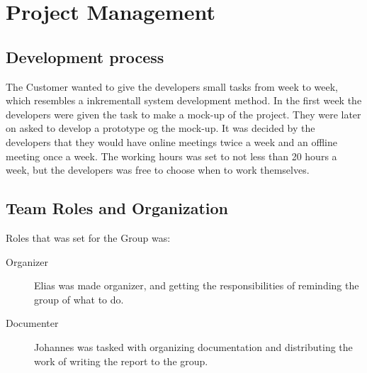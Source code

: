 \chapter{Project Management}
\section{Development process}
The Customer wanted to give the developers small tasks from week to week, which resembles a inkrementall system development method.
In the first week the developers were given the task to make a mock-up of the project. They were later on asked to develop a prototype og the mock-up.
It was decided by the developers that they would have online meetings twice a week and an offline meeting once a week. 
The working hours was set to not less than 20 hours a week, but the developers was free to choose when to work themselves.
\section{Team Roles and Organization}
Roles that was set for the Group was:
\begin{description}

\item[Organizer] Elias was made organizer, and getting the responsibilities of reminding the group of what to do.
\item[Documenter] Johannes was tasked with organizing documentation and distributing the work of writing the report to the group. 
\end{description}
 
